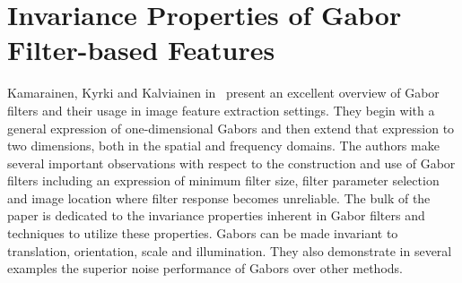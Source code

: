 \documentclass[letterpaper]{article}
\date{\today}
\begin{document}
\maketitle

\section{Invariance Properties of Gabor Filter-based Features}
Kamarainen, Kyrki and Kalviainen in~\cite{k-paper} present an
excellent overview of Gabor filters and their usage in image feature
extraction settings.  They begin with a general expression of
one-dimensional Gabors and then extend that expression to two
dimensions, both in the spatial and frequency domains.  The authors
make several important observations with respect to the construction
and use of Gabor filters including an expression of minimum filter
size, filter parameter selection and image location where filter
response becomes unreliable.  The bulk of the paper is dedicated to
the invariance properties inherent in Gabor filters and techniques to
utilize these properties.  Gabors can be made invariant to
translation, orientation, scale and illumination.  They also
demonstrate in several examples the superior noise performance of
Gabors over other methods.






\end{document}
